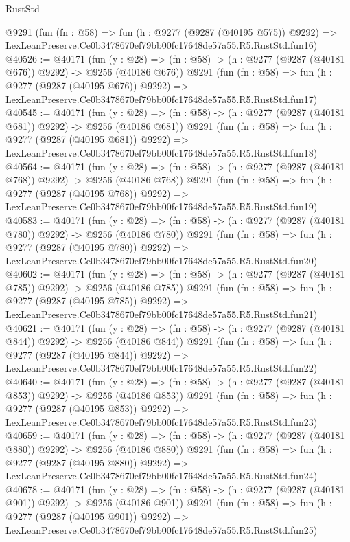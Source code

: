 \begin{lexlean}{RustStd}
\begin{coremodule}
    @9291
    (fun (fn : @58) =>
    fun (h : @9277 (@9287 (@40195 @575)) @9292) =>
    LexLeanPreserve.Ce0b3478670ef79bb00fc17648de57a55.R5.RustStd.fun16)
@40526 := @40171
    (fun (y : @28) => (fn : @58) -> (h : @9277 (@9287 (@40181 @676)) @9292) -> @9256 (@40186 @676))
    @9291
    (fun (fn : @58) =>
    fun (h : @9277 (@9287 (@40195 @676)) @9292) =>
    LexLeanPreserve.Ce0b3478670ef79bb00fc17648de57a55.R5.RustStd.fun17)
@40545 := @40171
    (fun (y : @28) => (fn : @58) -> (h : @9277 (@9287 (@40181 @681)) @9292) -> @9256 (@40186 @681))
    @9291
    (fun (fn : @58) =>
    fun (h : @9277 (@9287 (@40195 @681)) @9292) =>
    LexLeanPreserve.Ce0b3478670ef79bb00fc17648de57a55.R5.RustStd.fun18)
@40564 := @40171
    (fun (y : @28) => (fn : @58) -> (h : @9277 (@9287 (@40181 @768)) @9292) -> @9256 (@40186 @768))
    @9291
    (fun (fn : @58) =>
    fun (h : @9277 (@9287 (@40195 @768)) @9292) =>
    LexLeanPreserve.Ce0b3478670ef79bb00fc17648de57a55.R5.RustStd.fun19)
@40583 := @40171
    (fun (y : @28) => (fn : @58) -> (h : @9277 (@9287 (@40181 @780)) @9292) -> @9256 (@40186 @780))
    @9291
    (fun (fn : @58) =>
    fun (h : @9277 (@9287 (@40195 @780)) @9292) =>
    LexLeanPreserve.Ce0b3478670ef79bb00fc17648de57a55.R5.RustStd.fun20)
@40602 := @40171
    (fun (y : @28) => (fn : @58) -> (h : @9277 (@9287 (@40181 @785)) @9292) -> @9256 (@40186 @785))
    @9291
    (fun (fn : @58) =>
    fun (h : @9277 (@9287 (@40195 @785)) @9292) =>
    LexLeanPreserve.Ce0b3478670ef79bb00fc17648de57a55.R5.RustStd.fun21)
@40621 := @40171
    (fun (y : @28) => (fn : @58) -> (h : @9277 (@9287 (@40181 @844)) @9292) -> @9256 (@40186 @844))
    @9291
    (fun (fn : @58) =>
    fun (h : @9277 (@9287 (@40195 @844)) @9292) =>
    LexLeanPreserve.Ce0b3478670ef79bb00fc17648de57a55.R5.RustStd.fun22)
@40640 := @40171
    (fun (y : @28) => (fn : @58) -> (h : @9277 (@9287 (@40181 @853)) @9292) -> @9256 (@40186 @853))
    @9291
    (fun (fn : @58) =>
    fun (h : @9277 (@9287 (@40195 @853)) @9292) =>
    LexLeanPreserve.Ce0b3478670ef79bb00fc17648de57a55.R5.RustStd.fun23)
@40659 := @40171
    (fun (y : @28) => (fn : @58) -> (h : @9277 (@9287 (@40181 @880)) @9292) -> @9256 (@40186 @880))
    @9291
    (fun (fn : @58) =>
    fun (h : @9277 (@9287 (@40195 @880)) @9292) =>
    LexLeanPreserve.Ce0b3478670ef79bb00fc17648de57a55.R5.RustStd.fun24)
@40678 := @40171
    (fun (y : @28) => (fn : @58) -> (h : @9277 (@9287 (@40181 @901)) @9292) -> @9256 (@40186 @901))
    @9291
    (fun (fn : @58) =>
    fun (h : @9277 (@9287 (@40195 @901)) @9292) =>
    LexLeanPreserve.Ce0b3478670ef79bb00fc17648de57a55.R5.RustStd.fun25)

\end{coremodule}
\end{lexlean}
